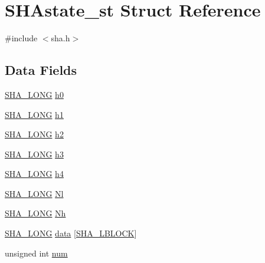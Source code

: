 \hypertarget{struct_s_h_astate__st}{}\section{S\+H\+Astate\+\_\+st Struct Reference}
\label{struct_s_h_astate__st}


{\ttfamily \#include $<$sha.\+h$>$}

\subsection*{Data Fields}
\begin{DoxyCompactItemize}
\item 
\hyperlink{include_2openssl_2sha_8h_a1b2e699d6af9a09d35e23c231e415c6c}{S\+H\+A\+\_\+\+L\+O\+NG} \hyperlink{struct_s_h_astate__st_a66b225c56f4115aa9aaacfcdbc2d1d59}{h0}
\item 
\hyperlink{include_2openssl_2sha_8h_a1b2e699d6af9a09d35e23c231e415c6c}{S\+H\+A\+\_\+\+L\+O\+NG} \hyperlink{struct_s_h_astate__st_ae7c9ea2e90661419985213ed54f8d9ca}{h1}
\item 
\hyperlink{include_2openssl_2sha_8h_a1b2e699d6af9a09d35e23c231e415c6c}{S\+H\+A\+\_\+\+L\+O\+NG} \hyperlink{struct_s_h_astate__st_af9bdc619992104ff7968a17e350f7035}{h2}
\item 
\hyperlink{include_2openssl_2sha_8h_a1b2e699d6af9a09d35e23c231e415c6c}{S\+H\+A\+\_\+\+L\+O\+NG} \hyperlink{struct_s_h_astate__st_ad4fdef9330444e26a023ca2ab4f12d93}{h3}
\item 
\hyperlink{include_2openssl_2sha_8h_a1b2e699d6af9a09d35e23c231e415c6c}{S\+H\+A\+\_\+\+L\+O\+NG} \hyperlink{struct_s_h_astate__st_a429aad789194a84a379cba13ed6f7124}{h4}
\item 
\hyperlink{include_2openssl_2sha_8h_a1b2e699d6af9a09d35e23c231e415c6c}{S\+H\+A\+\_\+\+L\+O\+NG} \hyperlink{struct_s_h_astate__st_a68e0afc627fc16aa87fff8dbba1be42e}{Nl}
\item 
\hyperlink{include_2openssl_2sha_8h_a1b2e699d6af9a09d35e23c231e415c6c}{S\+H\+A\+\_\+\+L\+O\+NG} \hyperlink{struct_s_h_astate__st_a29a417b9afaabf41fd980b3424c91755}{Nh}
\item 
\hyperlink{include_2openssl_2sha_8h_a1b2e699d6af9a09d35e23c231e415c6c}{S\+H\+A\+\_\+\+L\+O\+NG} \hyperlink{struct_s_h_astate__st_ac27c0f62ef736cf54667d9ae275e3dc1}{data} \mbox{[}\hyperlink{include_2openssl_2sha_8h_a8902af97bc4411166213b43c6d2057d2}{S\+H\+A\+\_\+\+L\+B\+L\+O\+CK}\mbox{]}
\item 
unsigned int \hyperlink{struct_s_h_astate__st_a41ddefd3473727cad32a9767c10faed8}{num}
\end{DoxyCompactItemize}


